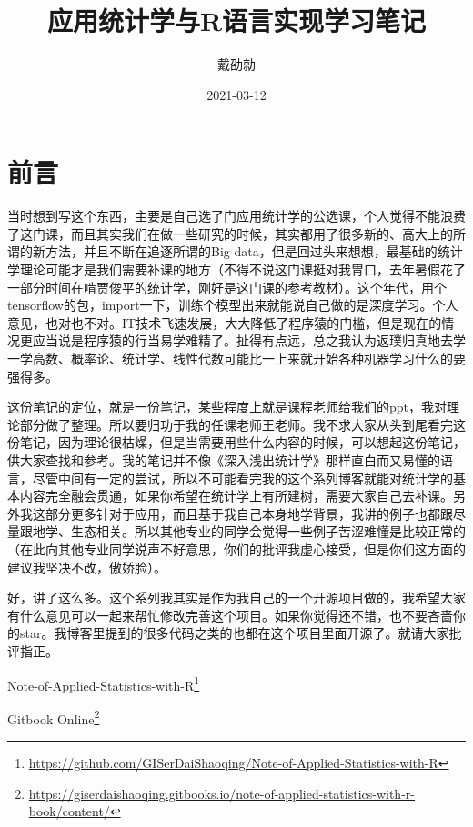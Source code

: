 \documentclass[]{ctexbook}
\title{应用统计学与R语言实现学习笔记}
\author{戴劭勍}
\date{2021-03-12}
\renewcommand{\href}[2]{#2\footnote{\url{#1}}}
\begin{document}
\maketitle


\thispagestyle{empty}



\setlength{\abovedisplayskip}{-5pt}
\setlength{\abovedisplayshortskip}{-5pt}

{
\setcounter{tocdepth}{2}
\tableofcontents
}
\hypertarget{ux524dux8a00}{%
\chapter*{前言}\label{ux524dux8a00}}


当时想到写这个东西，主要是自己选了门应用统计学的公选课，个人觉得不能浪费了这门课，而且其实我们在做一些研究的时候，其实都用了很多新的、高大上的所谓的新方法，并且不断在追逐所谓的Big data，但是回过头来想想，最基础的统计学理论可能才是我们需要补课的地方（不得不说这门课挺对我胃口，去年暑假花了一部分时间在啃贾俊平的统计学，刚好是这门课的参考教材）。这个年代，用个tensorflow的包，import一下，训练个模型出来就能说自己做的是深度学习。个人意见，也对也不对。IT技术飞速发展，大大降低了程序猿的门槛，但是现在的情况更应当说是程序猿的行当易学难精了。扯得有点远，总之我认为返璞归真地去学一学高数、概率论、统计学、线性代数可能比一上来就开始各种机器学习什么的要强得多。

这份笔记的定位，就是一份笔记，某些程度上就是课程老师给我们的ppt，我对理论部分做了整理。所以要归功于我的任课老师王老师。我不求大家从头到尾看完这份笔记，因为理论很枯燥，但是当需要用些什么内容的时候，可以想起这份笔记，供大家查找和参考。我的笔记并不像《深入浅出统计学》那样直白而又易懂的语言，尽管中间有一定的尝试，所以不可能看完我的这个系列博客就能对统计学的基本内容完全融会贯通，如果你希望在统计学上有所建树，需要大家自己去补课。另外我这部分更多针对于应用，而且基于我自己本身地学背景，我讲的例子也都跟尽量跟地学、生态相关。所以其他专业的同学会觉得一些例子苦涩难懂是比较正常的（在此向其他专业同学说声不好意思，你们的批评我虚心接受，但是你们这方面的建议我坚决不改，傲娇脸）。

好，讲了这么多。这个系列我其实是作为我自己的一个开源项目做的，我希望大家有什么意见可以一起来帮忙修改完善这个项目。如果你觉得还不错，也不要吝啬你的star。我博客里提到的很多代码之类的也都在这个项目里面开源了。就请大家批评指正。

\href{https://github.com/GISerDaiShaoqing/Note-of-Applied-Statistics-with-R}{Note-of-Applied-Statistics-with-R}

\href{https://giserdaishaoqing.gitbooks.io/note-of-applied-statistics-with-r-book/content/}{Gitbook Online}
\end{document}

